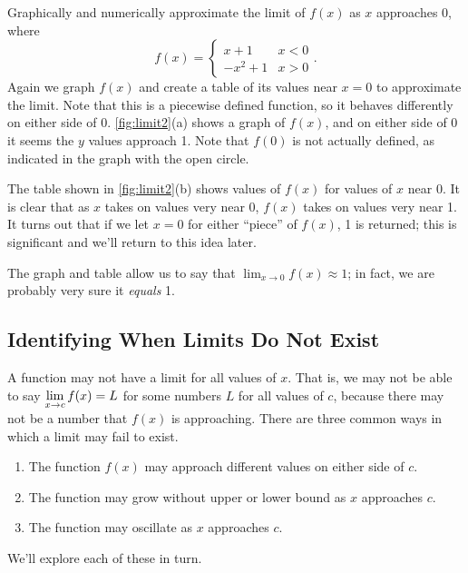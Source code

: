 \begin{example}\label{ex_limit2}%
Graphically and numerically approximate the limit of $f(x)$ as $x$ approaches 0, where\vspace{-.3\baselineskip}
\[f(x) = \begin{cases} x+1 & x< 0 \\ -x^2+1 & x > 0 \end{cases}.\]
\solution
Again we graph $f(x)$ and create a table of its values near $x=0$ to approximate the limit. Note that this is a piecewise defined function, so it behaves differently on either side of 0. \autoref{fig:limit2}(a) shows a graph of $f(x)$, and on either side of 0 it seems the $y$ values approach 1. Note that $f(0)$ is not actually defined, as indicated in the graph with the open circle.

The table shown in \autoref{fig:limit2}(b) shows values of $f(x)$ for values of $x$ near 0. It is clear that as $x$ takes on values very near 0, $f(x)$ takes on values very near 1. It turns out that if we let $x=0$ for either ``piece'' of $f(x)$, 1 is returned; this is significant and we'll return to this idea later.

The graph and table allow us to say that $\lim_{x\to 0}f(x) \approx 1$; in fact, we are probably very sure it \emph{equals} 1.
\end{example}

\subsection{Identifying When Limits Do Not Exist}

A function may not have a limit for all values of $x$. That is, we may not be able to say $\displaystyle\lim_{x\to c}f(x)=L$ for some numbers $L$ for all values of $c$, because there may not be a number that $f(x)$ is approaching. There are three common ways in which a limit may fail to exist. 
\begin{enumerate}
	\item	The function $f(x)$ may approach different values on either side of $c$.
	\item	The function may grow without upper or lower bound as $x$ approaches $c$.
	\item	The function may oscillate as $x$ approaches $c$.
\end{enumerate}

We'll explore each of these in turn.\bigskip

